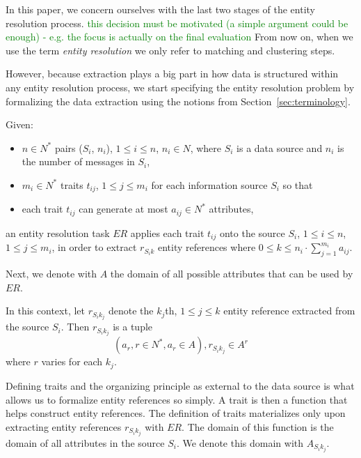 \documentclass[journal]{IEEEtran}
\begin{document}
    In this paper, we concern ourselves with the last two stages of the entity
    resolution process.
    \textcolor{green}{this decision must be motivated (a simple argument could be enough) - e.g. the focus is actually on the final evaluation}
    From now on, when we use the term \textit{entity resolution} we only refer
    to matching and clustering steps.

    However, because extraction plays a big part in how data is structured
    within any entity resolution process, we start specifying the entity resolution problem by formalizing the data extraction using the notions from
    Section~\ref{sec:terminology}.
    
    Given:
    \begin{itemize}
        \item $n \in N^*$ pairs ($S_i$, $n_i$), $1 \leq i \leq n$, $n_i \in N$, 
        where $S_i$ is a data source and $n_i$ is the number of messages in
        $S_i$,
        \item $m_i \in N^*$ traits $t_{ij}$, $1 \leq j \leq m_i$ for each
        information source $S_i$ so that
        \item each trait $t_{ij}$ can generate at most $a_{ij} \in N^*$
        attributes,
    \end{itemize}
    an entity resolution task $ER$ applies each trait $t_{ij}$ onto the source
    $S_i$, $1 \leq i \leq n$, $1 \leq j \leq m_i$, in order to extract
    $r_{{S_i}k}$ entity references where
    $0 \leq k \leq n_i \cdot \sum^{m_i}_{j=1}a_{ij}$.
    
    Next, we denote with $A$ the domain of all possible attributes that can be
    used by $ER$.

    In this context, let $r_{{S_i}{k_j}}$ denote the $k_j$th, $1 \leq j \leq k$
    entity reference extracted from the source $S_i$.
    Then $r_{{S_i}{k_j}}$ is a tuple
    \[
        (a_r, r \in N^*, a_r \in A), r_{{S_i}{k_j}} \in A^r
    \]
    where $r$ varies for each $k_j$.

    Defining traits and the organizing principle as external to the data source
    is what allows us to formalize entity references so simply.
    A trait is then a function that helps construct entity references.
    The definition of traits materializes only upon extracting entity references
    $r_{{S_i}{k_j}}$ with $ER$.
    The domain of this function is the domain of all attributes in the source
    $S_i$.
    We denote this domain with $A_{{S_i}{k_j}}$.
    
\end{document}

